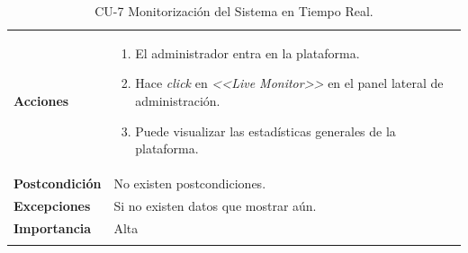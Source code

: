 \begin{longtable}[H]{@{}ll@{}}
\begin{minipage}[t]{0.23\columnwidth}
\textbf{Acciones}\strut
\end{minipage} & \begin{minipage}[t]{0.71\columnwidth}\raggedright\strut
\begin{enumerate}
\def\labelenumi{\arabic{enumi}.}
\tightlist
\item El administrador entra en la plataforma.
\item Hace \textit{click} en \textit{<<Live Monitor>>} en el panel lateral de administración.
\item Puede visualizar las estadísticas generales de la plataforma.
\end{enumerate}\strut
\end{minipage}\tabularnewline
\begin{minipage}[t]{0.23\columnwidth}\raggedright\strut
\textbf{Postcondición}\strut
\end{minipage} & \begin{minipage}[t]{0.71\columnwidth}\raggedright\strut
No existen postcondiciones.\strut
\end{minipage}\tabularnewline
\begin{minipage}[t]{0.23\columnwidth}\raggedright\strut
\textbf{Excepciones}\strut
\end{minipage} & \begin{minipage}[t]{0.71\columnwidth}\raggedright\strut
Si no existen datos que mostrar aún.\strut
\end{minipage}\tabularnewline
\begin{minipage}[t]{0.23\columnwidth}\raggedright\strut
\textbf{Importancia}\strut
\end{minipage} & \begin{minipage}[t]{0.71\columnwidth}\raggedright\strut
Alta\strut
\end{minipage}\tabularnewline
\bottomrule
\caption{CU-7 Monitorización del Sistema en Tiempo Real.}
\end{longtable}

